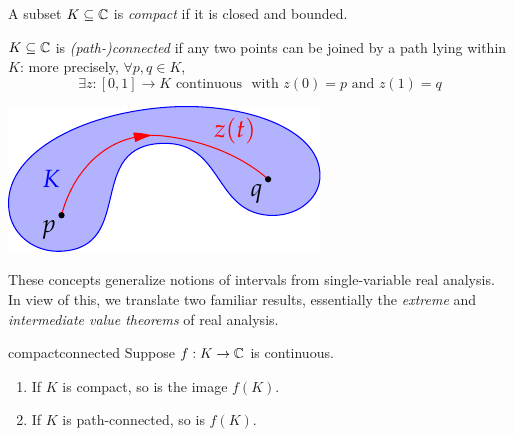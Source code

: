 \begin{defn}{}{}
	\exstart A subset $K\subseteq\mathbb{C}$ is \emph{compact} if it is closed and bounded.
	\begin{enumerate}\setcounter{enumi}{1}
	  \begin{minipage}[t]{0.61\linewidth}\vspace{-5pt}
	  	\item $K\subseteq\mathbb{C}$ is \emph{(path-)connected}\footnotemark{} if any two points can be joined by a path lying within $K$: more precisely, $\forall p,q\in K$,
	  	\[
	  		\exists z:[0,1]\to K \text{ continuous } \text{ with }
	  z(0)=p \text{ and }z(1)=q
	  	\]
	  \end{minipage}
	  \hfill 
	  \begin{minipage}[t]{0.38\linewidth}\vspace{-20pt}
			\flushright\includegraphics{limits-topology}
	  \end{minipage} 
	\end{enumerate} 
\end{defn}


\goodbreak

These concepts generalize notions of intervals from single-variable real analysis. In view of this, we translate two familiar results, essentially the \emph{extreme} and \emph{intermediate value theorems} of real analysis.

\begin{thm}{}{compactconnected}
	Suppose $f:K\to\mathbb{C}$ is continuous.
	\begin{enumerate}
  	\item If $K$ is compact, so is the image $f(K)$.
  	\item If $K$ is path-connected, so is $f(K)$.
	\end{enumerate}
\end{thm}


